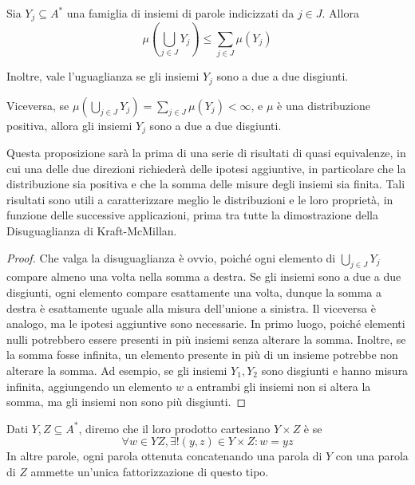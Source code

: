 \begin{proposition}\label{prop:dist_union_leq_sum_dist}
  Sia \(Y_j \subseteq A^*\) una famiglia di insiemi di parole indicizzati da \(j \in J\). 
  Allora
  \[\mu(\bigcup_{j \in J}Y_j) \leq \sum_{j\in J} \mu(Y_j)\]

  Inoltre, vale l'uguaglianza se gli insiemi \(Y_j\) sono a due a due disgiunti.

  Viceversa, se \(\mu(\bigcup_{j \in J}Y_j) = \sum_{j\in J} \mu(Y_j) < \infty\), e \(\mu\) è una distribuzione positiva, allora gli insiemi \(Y_j\) sono a due a due disgiunti.
\end{proposition}

Questa proposizione sarà la prima di una serie di risultati di quasi equivalenze, in cui una delle due direzioni richiederà delle ipotesi aggiuntive, in particolare che la distribuzione sia positiva e che la somma delle misure degli insiemi sia finita.
Tali risultati sono utili a caratterizzare meglio le distribuzioni e le loro proprietà, in funzione delle successive applicazioni, prima tra tutte la dimostrazione della Disuguaglianza di Kraft-McMillan.

\begin{proof}
  Che valga la disuguaglianza è ovvio, poiché ogni elemento di \(\bigcup_{j \in J}Y_j\) compare almeno una volta nella somma a destra.
  Se gli insiemi sono a due a due disgiunti, ogni elemento compare esattamente una volta, dunque la somma a destra è esattamente uguale alla misura dell'unione a sinistra.
  Il viceversa è analogo, ma le ipotesi aggiuntive sono necessarie.
  In primo luogo, poiché elementi nulli potrebbero essere presenti in più insiemi senza alterare la somma.
  Inoltre, se la somma fosse infinita, un elemento presente in più di un insieme potrebbe non alterare la somma.
  Ad esempio, se gli insiemi \(Y_1,Y_2\) sono disgiunti e hanno misura infinita, aggiungendo un elemento \(w\) a entrambi gli insiemi non si altera la somma, ma gli insiemi non sono più disgiunti.
\end{proof}

\begin{definition}
  Dati \(Y,Z \subseteq A^*\), diremo che il loro prodotto cartesiano \(Y\times Z\) è  se
    \[\forall w \in YZ, \exists! (y,z) \in Y \times Z : w = yz\]
  In altre parole, ogni parola ottenuta concatenando una parola di \(Y\) con una parola di \(Z\) ammette un'unica fattorizzazione di questo tipo.
\end{definition}

